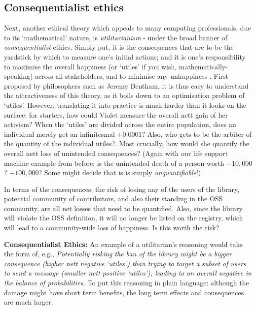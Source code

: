 \documentclass[journal,twocolumn]{IEEEtran}
\begin{document}
\subsection{Consequentialist ethics}
Next, another ethical theory which appeals to many computing professionals, due to its `mathematical' nature, is \textit{utilitarianism} - under the broad banner of \textit{consequentialist} ethics. Simply put, it is the consequences that are to be the yardstick by which to measure one's initial actions; and it is one's responsibility to maximise the overall happiness (or `utiles' if you wish, mathematically-speaking) across all stakeholders, and to minimise any unhappiness \cite{Rachels2015}. First proposed by philosophers such as Jeremy Bentham, it is thus easy to understand the attractiveness of this theory, as it boils down to an optimisation problem of `utiles'. However, translating it into practice is much harder than it looks on the surface: for starters, how could Violet measure the overall nett gain of her activism? When the `utiles' are divided across the entire population, does an individual merely get an infinitesmal $+0.0001$? Also, who gets to be the arbiter of the quantity of the individual utiles?. Most crucially, how would she quantify the overall nett loss of unintended consequences? (Again with our life support machine example from before: is the unintended death of a person worth $-10,000$? $-100,000$? Some might decide that is is simply \textit{unquantifiable}!)

In terms of the consequences, the risk of losing any of the users of the library, potential community of contributors, and also their standing in the OSS community, are all net losses that need to be quantified. 
Also, since the library will violate the OSS definition, it will no longer be listed on the registry, which will lead to a community-wide loss of happiness. Is this worth the risk?

\begin{tcolorbox}
\textbf{Consequentialist Ethics:}
An example of a utilitarian's reasoning would take the form of, e.g., \textit{Potentially risking the ban of the library might be a bigger consequence (higher nett negative `utiles') than trying to target a subset of users to send a message (smaller nett positive `utiles'), leading to an overall negative in the balance of probabilities.} 
To put this reasoning in plain language: although the damage might have short term benefits, the long term effects and consequences are much larger. 
\end{tcolorbox}
\end{document}
